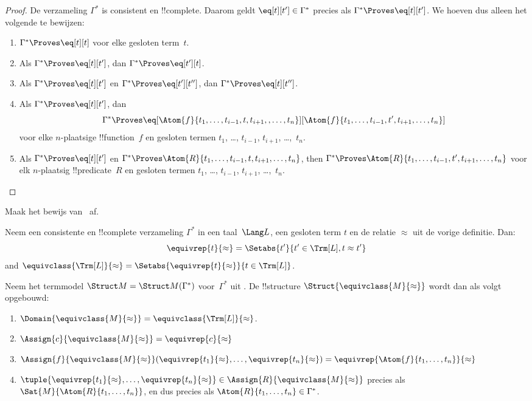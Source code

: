 \documentclass[openany]{memoir}
\begin{document}
\begin{proof}
De verzameling $\Gamma^*$ is consistent en !!{complete}. Daarom geldt
$\eq[t][t'] \in \Gamma^*$ precies als
$\Gamma^* \Proves \eq[t][t']$. We hoeven dus alleen het volgende te bewijzen:
\begin{enumerate}
\item $\Gamma^* \Proves \eq[t][t]$ voor elke gesloten term~$t$.
\item Als $\Gamma^* \Proves \eq[t][t']$, dan $\Gamma^* \Proves \eq[t'][t]$.
\item Als $\Gamma^* \Proves \eq[t][t']$ en $\Gamma^* \Proves
  \eq[t'][t'']$, dan $\Gamma^* \Proves \eq[t][t'']$.
\item Als $\Gamma^* \Proves \eq[t][t']$, dan
\[
\Gamma^* \Proves
\eq[\Atom{f}{t_1,\dots,t_{i-1},t,t_{i+1},,\dots,t_n}][\Atom{f}{t_1,\dots,t_{i-1},t',t_{i+1},\dots,t_n}]
\]
voor elke $n$-plaatsige !!{function}~$f$ en gesloten termen $t_1$, \dots,
$t_{i-1}$, $t_{i+1}$, \dots,~$t_n$.
\item Als $\Gamma^* \Proves \eq[t][t']$ en
$\Gamma^* \Proves
\Atom{R}{t_1,\dots,t_{i-1},t,t_{i+1},\dots,t_n}$, then
$\Gamma^* \Proves \Atom{R}{t_1,\dots,t_{i-1},t',t_{i+1},\dots,t_n}$
voor elk $n$-plaatsig !!{predicate}~$R$ en gesloten termen $t_1$, \dots,
$t_{i-1}$, $t_{i+1}$, \dots,~$t_n$.
\end{enumerate}
\end{proof}

\begin{prob}
Maak het bewijs van~ af.
\end{prob}

\begin{defn}
Neem een consistente en !!{complete} verzameling $\Gamma^*$ in een
taal~$\Lang L$, een gesloten term $t$ en de relatie $\approx$ uit de
vorige definitie. Dan:
\[
\equivrep{t}{\approx} = \Setabs{t'}{t'\in \Trm[L], t \approx t'}
\]
and $\equivclass{\Trm[L]}{\approx} = \Setabs{\equivrep{t}{\approx}}{t \in \Trm[L]}$.
\end{defn}

\begin{defn}
Neem het termmodel $\Struct M = \Struct M(\Gamma^*)$ voor~$\Gamma^*$ uit
. De !!{structure}
$\Struct{\equivclass{M}{\approx}}$ wordt dan als volgt opgebouwd:
\begin{enumerate}
\item $\Domain{\equivclass{M}{\approx}} = \equivclass{\Trm[L]}{\approx}$.
\item $\Assign{c}{\equivclass{M}{\approx}} = \equivrep{c}{\approx}$
\item $\Assign{f}{\equivclass{M}{\approx}}(\equivrep{t_1}{\approx}, \dots,
  \equivrep{t_n}{\approx}) = \equivrep{\Atom{f}{t_1,\dots, t_n}}{\approx}$
\item $\tuple{\equivrep{t_1}{\approx}, \dots, \equivrep{t_n}{\approx}} \in
  \Assign{R}{\equivclass{M}{\approx}}$ precies als
  $\Sat{M}{\Atom{R}{t_1,\dots, t_n}}$, en dus precies als
  $\Atom{R}{t_1,\dots,
  t_n} \in \Gamma^*$.
\end{enumerate}
\end{defn}
\end{document}
